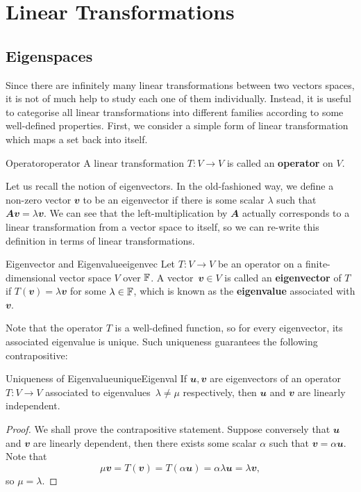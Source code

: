 \documentclass[math]{amznotes}
\theoremstyle{remark}
\begin{document}
\chapter{Linear Transformations}
\section{Eigenspaces}
Since there are infinitely many linear transformations between two vectors spaces, it is not of much help to study each one of them individually. Instead, it is useful to categorise all linear transformations into different families according to some well-defined properties. First, we consider a simple form of linear transformation which maps a set back into itself.
\begin{dfnbox}{Operator}{operator}
    A linear transformation $T \colon V \to V$ is called an {\color{red} \textbf{operator}} on $V$.
\end{dfnbox}
Let us recall the notion of eigenvectors. In the old-fashioned way, we define a non-zero vector $\mathbfit{v}$ to be an eigenvector if there is some scalar $\lambda$ such that $\mathbfit{Av} = \lambda\mathbfit{v}$. We can see that the left-multiplication by $\mathbfit{A}$ actually corresponds to a linear transformation from a vector space to itself, so we can re-write this definition in terms of linear transformations.
\begin{dfnbox}{Eigenvector and Eigenvalue}{eigenvec}
    Let $T \colon V \to V$ be an operator on a finite-dimensional vector space $V$ over $\mathbb{F}$. A vector~$\mathbfit{v} \in V$ is called an {\color{red} \textbf{eigenvector}} of $T$ if $T(\mathbfit{v}) = \lambda\mathbfit{v}$ for some $\lambda \in \mathbb{F}$, which is known as the {\color{red} \textbf{eigenvalue}} associated with $\mathbfit{v}$.
\end{dfnbox}
Note that the operator $T$ is a well-defined function, so for every eigenvector, its associated eigenvalue is unique. Such uniqueness guarantees the following contrapositive:
\begin{probox}{Uniqueness of Eigenvalue}{uniqueEigenval}
    If $\mathbfit{u}, \mathbfit{v}$ are eigenvectors of an operator $T \colon V \to V$ associated to eigenvalues~$\lambda \neq \mu$ respectively, then $\mathbfit{u}$ and $\mathbfit{v}$ are linearly independent.
    \tcblower
    \begin{proof}
        We shall prove the contrapositive statement. Suppose conversely that $\mathbfit{u}$ and $\mathbfit{v}$ are linearly dependent, then there exists some scalar $\alpha$ such that $\mathbfit{v} = \alpha\mathbfit{u}$. Note that 
        \begin{equation*}
            \mu\mathbfit{v} = T(\mathbfit{v}) = T(\alpha\mathbfit{u}) = \alpha\lambda\mathbfit{u} = \lambda\mathbfit{v},
        \end{equation*}
        so $\mu = \lambda$.
    \end{proof}
\end{probox}
\end{document}
